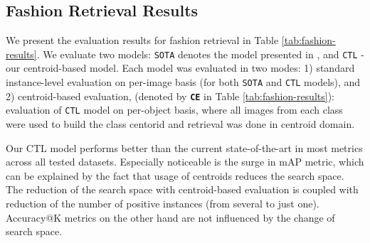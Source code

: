 \documentclass[sigconf,nonacm]{acmart}
\begin{document}
\begin{table}[!h]
\centering
\caption{Person Re-Identification Results}
\label{tab:reid-results}
\end{table}

\subsection{Fashion Retrieval Results}

We present the evaluation results for fashion retrieval in Table \ref{tab:fashion-results}. We evaluate two models: \texttt{SOTA} denotes the model presented in \cite{Wieczorek2020}, and \texttt{CTL} - our centroid-based model. Each model was evaluated in two modes: 1) standard instance-level evaluation on per-image basis (for both \texttt{SOTA} and \texttt{CTL} models), and 2) centroid-based evaluation, (denoted by \texttt{\textbf{CE}} in Table \ref{tab:fashion-results}): evaluation of \texttt{CTL} model on per-object basis, where all images from each class were used to build the class centorid and retrieval was done in centroid domain. 

Our CTL model performs better than the current state-of-the-art in most metrics across all tested datasets. Especially noticeable is the surge in mAP metric, which can be explained by the fact that usage of centroids reduces the search space. The reduction of the search space with centroid-based evaluation is coupled with reduction of the number of positive instances (from several to just one). Accuracy@K metrics on the other hand are not influenced by the change of search space.
\end{document}
